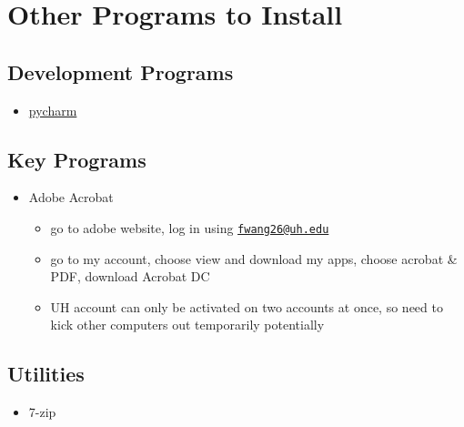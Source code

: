 \documentclass[
]{article}
\providecommand{\tightlist}{%
  \setlength{\itemsep}{0pt}\setlength{\parskip}{0pt}}
\begin{document}
\hypertarget{other-programs-to-install}{%
\section{Other Programs to Install}\label{other-programs-to-install}}

\hypertarget{development-programs}{%
\subsection{Development Programs}\label{development-programs}}

\begin{itemize}
\tightlist
\item
  \href{https://www.jetbrains.com/pycharm/}{pycharm}
\end{itemize}

\hypertarget{key-programs}{%
\subsection{Key Programs}\label{key-programs}}

\begin{itemize}
\tightlist
\item
  Adobe Acrobat

  \begin{itemize}
  \tightlist
  \item
    go to adobe website, log in using
    \href{mailto:fwang26@uh.edu}{\nolinkurl{fwang26@uh.edu}}
  \item
    go to my account, choose view and download my apps, choose acrobat
    \& PDF, download Acrobat DC
  \item
    UH account can only be activated on two accounts at once, so need to
    kick other computers out temporarily potentially
  \end{itemize}
\end{itemize}

\hypertarget{utilities}{%
\subsection{Utilities}\label{utilities}}

\begin{itemize}
\tightlist
\item
  7-zip
\end{itemize}
\end{document}
